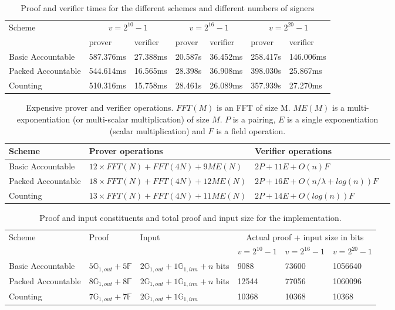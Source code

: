 \begin{table}[h!]
\begin{tabular}{| l | l | l | l | l |l | l |}

\hline

 Scheme & \multicolumn{2}{|c|}{$v = 2^{10}-1$} & \multicolumn{2}{|c|}{$v = 2^{16}-1$} & \multicolumn{2}{|c|}{$v = 2^{20}-1$}	 \\
\cline{2-7}
 &  prover & verifier & prover & verifier &  prover & verifier \\
\hline
Basic Accountable & 587.376ms & 27.388ms & 20.587s & 36.452ms & 258.417s & 146.006ms \\
Packed Accountable & 544.614ms & 16.565ms & 28.398s & 36.908ms & 398.030s & 25.867ms \\
Counting 			& 510.316ms & 15.758ms & 28.461s & 26.089ms & 357.939s & 27.270ms \\
\hline
\end{tabular}
\caption{Proof and verifier times for the different schemes and different numbers of signers}
\label{tab:benchmarks}
\end{table}


\begin{table}[h!]
\begin{tabular}{| l | l| l| l|}
\hline
Scheme & Prover operations  &Verifier operations \\
\hline
Basic Accountable & $12\times FFT(N)+FFT(4N)+9ME(N)$  & $2P+11E+O(n)F$ \\
Packed Accountable & $18\times FFT(N)+FFT(4N)+12ME(N)$  & $2P+16E+O(n/\lambda+log(n))F$ \\
Counting & $13\times FFT(N)+FFT(4N)+11ME(N)$  & $2P+14E+O(log(n))F$ \\
\hline
\end{tabular}
\caption{Expensive prover and verifier operations. $FFT(M)$ is an FFT of size M. $ME(M)$ is a multi-exponentiation (or multi-scalar multiplication) of size $M$. $P$ is a pairing, $E$ is a single exponentiation (scalar multiplication) and $F$ is a field operation.}
\label{tab:operations}
\end{table}

\begin{table}[h!]
\begin{tabular}{| l | l | l | l | l | l |}
\hline
Scheme & Proof & Input & \multicolumn{3}{|c|}{Actual proof + input size in bits} \\
\cline{4-6}
& & & $v = 2^{10}-1$ & $v = 2^{16}-1$ & $v = 2^{20}-1$ \\
\hline
Basic Accountable & $5\mathbb{G}_{1,out}+5\mathbb{F}$ & $2\mathbb{G}_{1,out}+1\mathbb{G}_{1,inn}+n$ bits & 9088 & 73600 & 1056640 \\
Packed Accountable & $8\mathbb{G}_{1,out}+8\mathbb{F}$ & $2\mathbb{G}_{1,out}+1\mathbb{G}_{1,inn}+n$ bits & 12544 & 77056 & 1060096 \\
Counting &  $7\mathbb{G}_{1,out}+7\mathbb{F}$ & $2\mathbb{G}_{1,out}+1\mathbb{G}_{1,inn}$ & 10368  & 10368  & 10368 \\
\hline
\end{tabular}
\caption{Proof and input constituents and total proof and input size for the implementation.}
\label{tab:proof-size}
\end{table}
